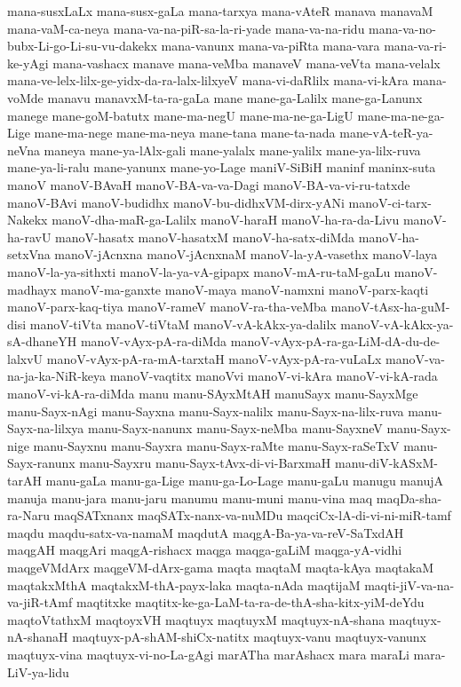 {mana-susxLaLx
mana-susx-gaLa
mana-tarxya
mana-vAteR
manava
manavaM
mana-vaM-ca-neya
mana-va-na-piR-sa-la-ri-yade
mana-va-na-ridu
mana-va-no-bubx-Li-go-Li-su-vu-dakekx
mana-vanunx
mana-va-piRta
mana-vara
mana-va-ri-ke-yAgi
mana-vashacx
manave
mana-veMba
manaveV
mana-veVta
mana-velalx
mana-ve-lelx-lilx-ge-yidx-da-ra-lalx-lilxyeV
mana-vi-daRlilx
mana-vi-kAra
mana-voMde
manavu
manavxM-ta-ra-gaLa
mane
mane-ga-Lalilx
mane-ga-Lanunx
manege
mane-goM-batutx
mane-ma-negU
mane-ma-ne-ga-LigU
mane-ma-ne-ga-Lige
mane-ma-nege
mane-ma-neya
mane-tana
mane-ta-nada
mane-vA-teR-ya-neVna
maneya
mane-ya-lAlx-gali
mane-yalalx
mane-yalilx
mane-ya-lilx-ruva
mane-ya-li-ralu
mane-yanunx
mane-yo-Lage
maniV-SiBiH
maninf
maninx-suta
manoV
manoV-BAvaH
manoV-BA-va-va-Dagi
manoV-BA-va-vi-ru-tatxde
manoV-BAvi
manoV-budidhx
manoV-bu-didhxVM-dirx-yANi
manoV-ci-tarx-Nakekx
manoV-dha-maR-ga-Lalilx
manoV-haraH
manoV-ha-ra-da-Livu
manoV-ha-ravU
manoV-hasatx
manoV-hasatxM
manoV-ha-satx-diMda
manoV-ha-setxVna
manoV-jAcnxna
manoV-jAcnxnaM
manoV-la-yA-vasethx
manoV-laya
manoV-la-ya-sithxti
manoV-la-ya-vA-gipapx
manoV-mA-ru-taM-gaLu
manoV-madhayx
manoV-ma-ganxte
manoV-maya
manoV-namxni
manoV-parx-kaqti
manoV-parx-kaq-tiya
manoV-rameV
manoV-ra-tha-veMba
manoV-tAsx-ha-guM-disi
manoV-tiVta
manoV-tiVtaM
manoV-vA-kAkx-ya-dalilx
manoV-vA-kAkx-ya-sA-dhaneYH
manoV-vAyx-pA-ra-diMda
manoV-vAyx-pA-ra-ga-LiM-dA-du-de-lalxvU
manoV-vAyx-pA-ra-mA-tarxtaH
manoV-vAyx-pA-ra-vuLaLx
manoV-va-na-ja-ka-NiR-keya
manoV-vaqtitx
manoVvi
manoV-vi-kAra
manoV-vi-kA-rada
manoV-vi-kA-ra-diMda
manu
manu-SAyxMtAH
manuSayx
manu-SayxMge
manu-Sayx-nAgi
manu-Sayxna
manu-Sayx-nalilx
manu-Sayx-na-lilx-ruva
manu-Sayx-na-lilxya
manu-Sayx-nanunx
manu-Sayx-neMba
manu-SayxneV
manu-Sayx-nige
manu-Sayxnu
manu-Sayxra
manu-Sayx-raMte
manu-Sayx-raSeTxV
manu-Sayx-ranunx
manu-Sayxru
manu-Sayx-tAvx-di-vi-BarxmaH
manu-diV-kASxM-tarAH
manu-gaLa
manu-ga-Lige
manu-ga-Lo-Lage
manu-gaLu
manugu
manujA
manuja
manu-jara
manu-jaru
manumu
manu-muni
manu-vina
maq
maqDa-sha-ra-Naru
maqSATxnanx
maqSATx-nanx-va-nuMDu
maqciCx-lA-di-vi-ni-miR-tamf
maqdu
maqdu-satx-va-namaM
maqdutA
maqgA-Ba-ya-va-reV-SaTxdAH
maqgAH
maqgAri
maqgA-rishacx
maqga
maqga-gaLiM
maqga-yA-vidhi
maqgeVMdArx
maqgeVM-dArx-gama
maqta
maqtaM
maqta-kAya
maqtakaM
maqtakxMthA
maqtakxM-thA-payx-laka
maqta-nAda
maqtijaM
maqti-jiV-va-na-va-jiR-tAmf
maqtitxke
maqtitx-ke-ga-LaM-ta-ra-de-thA-sha-kitx-yiM-deYdu
maqtoVtathxM
maqtoyxVH
maqtuyx
maqtuyxM
maqtuyx-nA-shana
maqtuyx-nA-shanaH
maqtuyx-pA-shAM-shiCx-natitx
maqtuyx-vanu
maqtuyx-vanunx
maqtuyx-vina
maqtuyx-vi-no-La-gAgi
marATha
marAshacx
mara
maraLi
mara-LiV-ya-lidu
}
